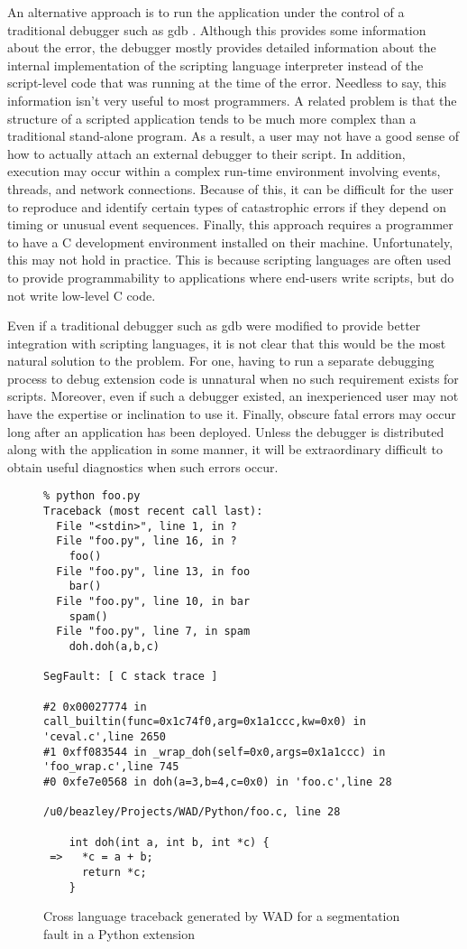 An alternative approach is to run the application under the control of
a traditional debugger such as gdb \cite{gdb}.  Although this provides
some information about the error, the debugger mostly provides
detailed information about the internal implementation of the
scripting language interpreter instead of the script-level code that
was running at the time of the error.  Needless to say, this information 
isn't very useful to most programmers.
A related problem is that
the structure of a scripted application tends to be much more complex
than a traditional stand-alone program.  As a result, a user may not
have a good sense of how to actually attach an external debugger to their
script.  In addition, execution may occur within a
complex run-time environment involving events, threads, and network
connections.  Because of this, it can be difficult for the user to reproduce
and identify certain types of catastrophic errors if they depend on
timing or unusual event sequences. Finally, this approach
requires a programmer to have a C development environment installed on
their machine.  Unfortunately, this may not hold in practice.
This is because scripting languages are often used to provide programmability to
applications where end-users write scripts, but do not write low-level C code.

Even if a traditional debugger such as gdb were modified to provide
better integration with scripting languages, it is not clear that this
would be the most natural solution to the problem.  For one, 
having to run a separate debugging process to debug
extension code is unnatural when no such requirement exists for
scripts.  Moreover, even if such a debugger existed, an
inexperienced user may not have the expertise or inclination to use
it.  Finally, obscure fatal errors may occur long after an application
has been deployed.  Unless the debugger is distributed along with the
application in some manner, it will be extraordinary difficult to
obtain useful diagnostics when such errors occur.

\begin{figure*}[t]
{\small
\begin{verbatim}
% python foo.py
Traceback (most recent call last):
  File "<stdin>", line 1, in ?
  File "foo.py", line 16, in ?
    foo()
  File "foo.py", line 13, in foo
    bar()
  File "foo.py", line 10, in bar
    spam()
  File "foo.py", line 7, in spam
    doh.doh(a,b,c)

SegFault: [ C stack trace ]

#2 0x00027774 in call_builtin(func=0x1c74f0,arg=0x1a1ccc,kw=0x0) in 'ceval.c',line 2650
#1 0xff083544 in _wrap_doh(self=0x0,args=0x1a1ccc) in 'foo_wrap.c',line 745
#0 0xfe7e0568 in doh(a=3,b=4,c=0x0) in 'foo.c',line 28

/u0/beazley/Projects/WAD/Python/foo.c, line 28

    int doh(int a, int b, int *c) {
 =>   *c = a + b;
      return *c;
    }
\end{verbatim}
}
\caption{Cross language traceback generated by WAD for a segmentation fault in a Python extension}
\end{figure*}

